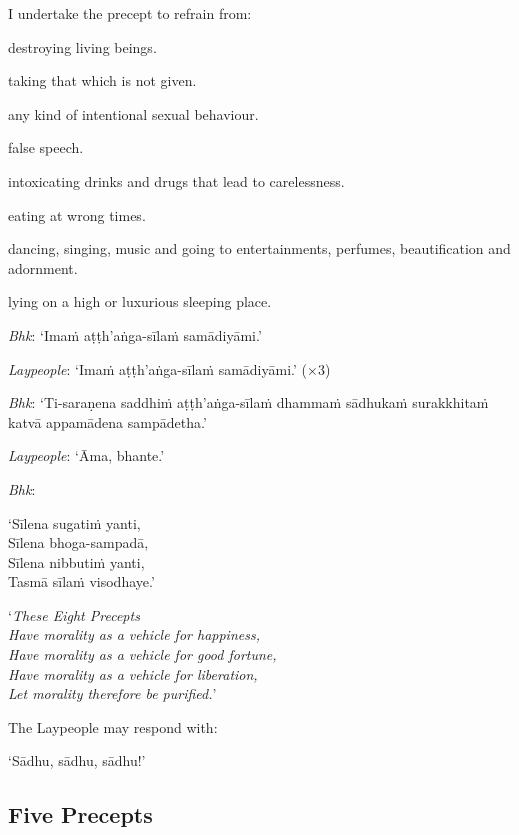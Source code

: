 
I undertake the precept to refrain from:

\begin{packeditemize}

\item destroying living beings.
\item taking that which is not given.
\item any kind of intentional sexual behaviour.
\item false speech.
\item intoxicating drinks and drugs that lead to carelessness.
\item eating at wrong times.
\item dancing, singing, music and going to entertainments, perfumes, beautification and adornment.
\item lying on a high or luxurious sleeping place.

\end{packeditemize}

\emph{Bhk}: ‘Imaṁ aṭṭh'aṅga-sīlaṁ samādiyāmi.’

\emph{Laypeople}: ‘Imaṁ aṭṭh'aṅga-sīlaṁ samādiyāmi.’ (×3)

\emph{Bhk}: ‘Ti-saraṇena saddhiṁ aṭṭh'aṅga-sīlaṁ dhammaṁ sādhukaṁ surakkhitaṁ
katvā appamādena sampādetha.’

\emph{Laypeople}: ‘Āma, bhante.’

\clearpage

\emph{Bhk}:

‘Sīlena sugatiṁ yanti,\\
Sīlena bhoga-sampadā,\\
Sīlena nibbutiṁ yanti,\\
Tasmā sīlaṁ visodhaye.’

‘\emph{These Eight Precepts\\
  Have morality as a vehicle for happiness,\\
  Have morality as a vehicle for good fortune,\\
  Have morality as a vehicle for liberation,\\
  Let morality therefore be purified.}’

The Laypeople may respond with:

‘Sādhu, sādhu, sādhu!’

\subsection{Five Precepts}

